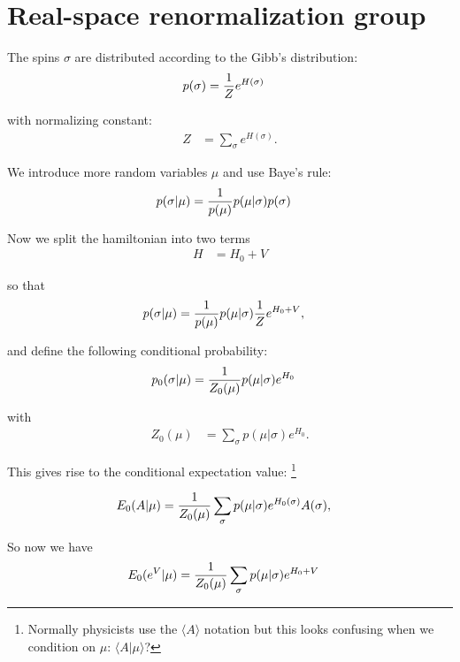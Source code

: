 \documentclass[11pt]{article}
\begin{document}
\section{Real-space renormalization group}


The spins $\sigma$ are distributed according
to the Gibb's distribution:
\begin{align*}
p(\sigma) &= {{1} \over {Z}}e^{H(\sigma)}
\end{align*}

with normalizing constant:
\begin{align*}
Z &= \sum_{\sigma} e^{H(\sigma)}.
\end{align*}

We introduce more random variables $\mu$ and
use Baye's rule:
\begin{align*}
p(\sigma | \mu) &= {{1} \over {p(\mu)}}p(\mu | \sigma)p(\sigma)
\end{align*}

Now we split the hamiltonian into two terms
\begin{align*}
H &= H_{0}+V
\end{align*}

so that
\begin{align*}
p(\sigma | \mu) &= {{1} \over {p(\mu)}}p(\mu | \sigma){{1} \over {Z}}e^{H_{0}+V},
\end{align*}

and define the following conditional probability:
\begin{align*}
p_{0}(\sigma | \mu) &= {{1} \over {Z_{0}(\mu)}}p(\mu | \sigma)e^{H_{0}}
\end{align*}

with
\begin{align*}
Z_{0}(\mu) &= \sum_{\sigma} p(\mu | \sigma)e^{H_{0}}.
\end{align*}

This gives rise to the conditional expectation value:
\footnote{Normally physicists use the $\langle A\rangle$ notation
but this looks confusing when we condition on
$\mu$: $\langle A|\mu\rangle$?}

\begin{align*}
E_{0}(A | \mu) &= {{1} \over {Z_{0}(\mu)}}\sum_{\sigma} p(\mu | \sigma)e^{H_{0}(\sigma)}A(\sigma),
\end{align*}

So now we have
\begin{align*}
E_{0}(e^{V} | \mu) &= {{1} \over {Z_{0}(\mu)}}\sum_{\sigma} p(\mu | \sigma)e^{H_{0}+V}
\end{align*}
\end{document}
